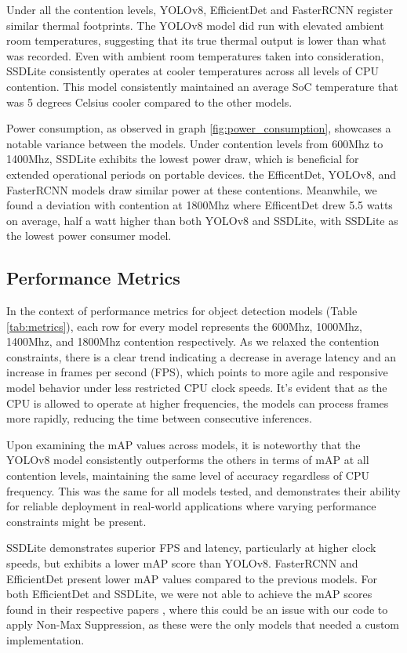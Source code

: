 \documentclass[10pt,twocolumn,letterpaper]{article}
\begin{document}
Under all the contention levels, YOLOv8, EfficientDet and FasterRCNN register similar thermal footprints. The YOLOv8 model did run with elevated ambient room temperatures, suggesting that its true thermal output is lower than what was recorded. Even with ambient room temperatures taken into consideration, SSDLite consistently operates at cooler temperatures across all levels of CPU contention. This model consistently maintained an average SoC temperature that was 5 degrees Celsius cooler compared to the other models.

Power consumption, as observed in graph \ref{fig:power_consumption}, showcases a notable variance between the models. Under contention levels from 600Mhz to 1400Mhz, SSDLite exhibits the lowest power draw, which is beneficial for extended operational periods on portable devices. the EfficentDet, YOLOv8, and FasterRCNN models draw similar power at these contentions. Meanwhile, we found a deviation with contention at 1800Mhz where EfficentDet drew 5.5 watts on average, half a watt higher than both YOLOv8 and SSDLite, with SSDLite as the lowest power consumer model.


\subsection{Performance Metrics}
\label{subsec:performance_metrics}
In the context of performance metrics for object detection models (Table \ref{tab:metrics}), each row for every model represents the 600Mhz, 1000Mhz, 1400Mhz, and 1800Mhz contention respectively. As we relaxed the contention constraints, there is a clear trend indicating a decrease in average latency and an increase in frames per second (FPS), which points to more agile and responsive model behavior under less restricted CPU clock speeds. It's evident that as the CPU is allowed to operate at higher frequencies, the models can process frames more rapidly, reducing the time between consecutive inferences.

Upon examining the mAP values  across models, it is noteworthy that the YOLOv8 model consistently outperforms the others in terms of mAP at all contention levels, maintaining the same level of accuracy regardless of CPU frequency. This was the same for all models tested, and demonstrates their ability for reliable deployment in real-world applications where varying performance constraints might be present.

SSDLite demonstrates superior FPS and latency, particularly at higher clock speeds, but exhibits a lower mAP score than YOLOv8. FasterRCNN and EfficientDet present lower mAP values compared to the previous models. For both EfficientDet and SSDLite, we were not able to achieve the mAP scores found in their respective papers \cite{tan2020efficientdet,Liu_2016}, where this could be an issue with our code to apply Non-Max Suppression, as these were the only models that needed a custom implementation.
\end{document}
